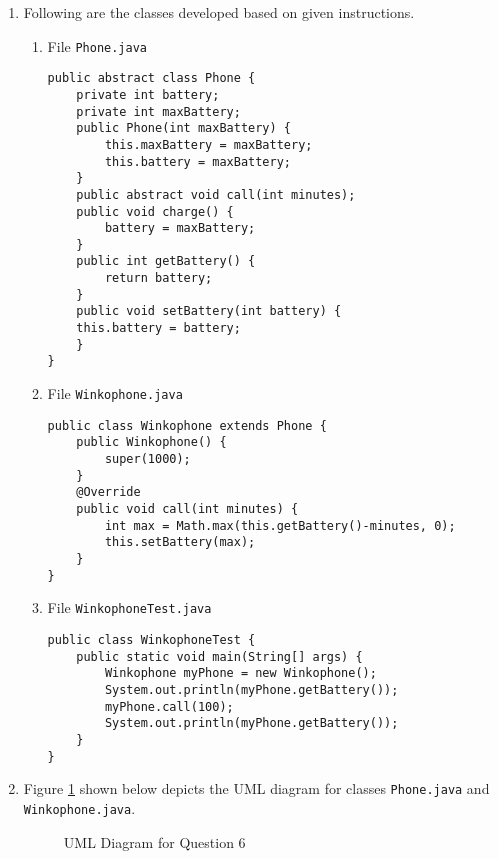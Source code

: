 \documentclass[12pt,letterpaper,twoside]{article}
\begin{document}
\begin{enumerate}[label=(\alph*)]
\item Following are the classes developed based on given instructions.
\begin{enumerate}[label=\arabic*.]
\item File \texttt{Phone.java}

\lstset{language=java, tabsize=2}
\begin{lstlisting}
public abstract class Phone {
	private int battery;
	private int maxBattery;
	public Phone(int maxBattery) {
		this.maxBattery = maxBattery;
		this.battery = maxBattery;
	}
	public abstract void call(int minutes);
	public void charge() {
		battery = maxBattery;
	}
	public int getBattery() {
		return battery;
	}
	public void setBattery(int battery) {
	this.battery = battery;
	}
}
\end{lstlisting}

\item File \texttt{Winkophone.java}

\lstset{language=java, tabsize=2}
\begin{lstlisting}
public class Winkophone extends Phone {
	public Winkophone() {
		super(1000);
	}
	@Override
	public void call(int minutes) {
		int max = Math.max(this.getBattery()-minutes, 0);
		this.setBattery(max);
	}
}
\end{lstlisting}

\item File \texttt{WinkophoneTest.java}

\lstset{language=java, tabsize=2}
\begin{lstlisting}
public class WinkophoneTest {
	public static void main(String[] args) {
		Winkophone myPhone = new Winkophone();
		System.out.println(myPhone.getBattery());
		myPhone.call(100);
		System.out.println(myPhone.getBattery());
	}
}
\end{lstlisting}
\end{enumerate}

\item Figure \ref{fig3} shown below depicts the UML diagram for classes \texttt{Phone.java} and \texttt{Winkophone.java}.
	\begin{figure}[H]
	\centering
	\caption{UML Diagram for Question 6}\label{fig3}
	\end{figure}
\end{enumerate}
\end{document}
